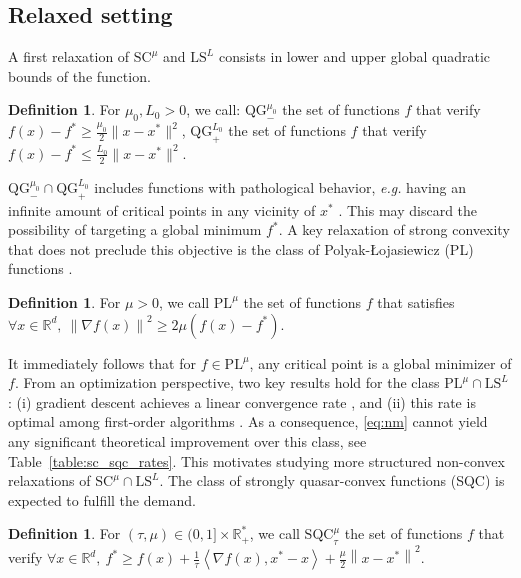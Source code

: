 \documentclass{article}
\def\R{{\mathbb{R}}}
\def\pl{{\text{PL}^\mu}}
\newcommand{\norm}[1]{\left\lVert#1\right\rVert}
\newcommand{\dotprod}[1]{\left< #1\right>}
\newcommand{\sqc}{\text{SQC}_{\tau}^{\mu}}
\newcommand{\ls}{\text{LS}^{L}}
\newcommand{\strongconv}{\text{SC}^{\mu}}
\newcommand{\qg}{\text{QG}_{+}^{L_0}}
\newcommand{\qginf}{\text{QG}_{-}^{\mu_0}}
\newcommand{\sqcf}[2]{\text{SQC}_{#1}^{#2}}
\newcommand{\plf}[1]{\text{PL}^{#1}}
\theoremstyle{plain}
\theoremstyle{definition}
\newtheorem{definition}[theorem]{Definition}
\theoremstyle{remark}
\begin{document}
 \subsection{Relaxed setting}\label{sec:relax_setting}
A first relaxation of $\strongconv$ and $\ls$ consists in lower and upper
global quadratic bounds of the function.
        \begin{definition}\label{ass:upp_qg}
                For $\mu_0,L_0 > 0$, we call: $\qginf$ the set of functions $f$ that verify
  $  f(x) - f^\ast \ge \frac{\mu_0}{2}\lVert x - x^\ast \rVert^2$, $\qg$ the set of functions $f$ that verify 
  $  f(x) - f^\ast \le \frac{L_0}{2}\lVert x - x^\ast \rVert^2$.
         \end{definition}
         $\qginf \cap \qg$ includes functions with pathological behavior, \textit{e.g.} having an infinite amount of critical points in any vicinity of $x^\ast$ \cite[Proposition 9]{hermant2024study}. This may discard the possibility of targeting a global minimum $f^\ast$.
          A key relaxation of strong convexity that does not preclude this objective is the class of Polyak-\L{}ojasiewicz (PL) functions \cite{Polyak1963,lojasiewicz1963topological}.   
\begin{definition}
    For $\mu>0$, we call $\pl$ the set of functions $f$ that satisfies $\forall x \in \R^d,~ \norm{\nabla f(x)}^2 \ge 2\mu(f(x)-f^\ast).$
\end{definition}
It immediately follows that for $f \in \pl$, any critical point is a global minimizer of $f$. From an optimization perspective, two key results hold for the class $\pl \cap \ls$: (i) gradient descent achieves a linear convergence rate \cite{Polyak1963}, and (ii) this rate is optimal among first-order algorithms \cite{PLlowerbound}. As a consequence, \eqref{eq:nm} cannot yield any significant theoretical improvement over this class, see Table~\ref{table:sc_sqc_rates}. This motivates studying more structured non-convex relaxations of $\strongconv \cap \ls$. The class of strongly quasar-convex functions (SQC) is expected to fulfill the demand.
\begin{definition}
    For $(\tau,\mu)\in (0,1]\times \mathbb{R}^\ast_+$, we call $\sqcf{\tau}{\mu}$ the set of functions $f$ that verify $\forall x\in \mathbb{R}^d,~ f^\ast \ge f(x) + \frac{1}{\tau}\dotprod{\nabla f(x),x^\ast-x} + \frac{\mu}{2}\norm{x-x^\ast}^2$.
\end{definition}
\end{document}
